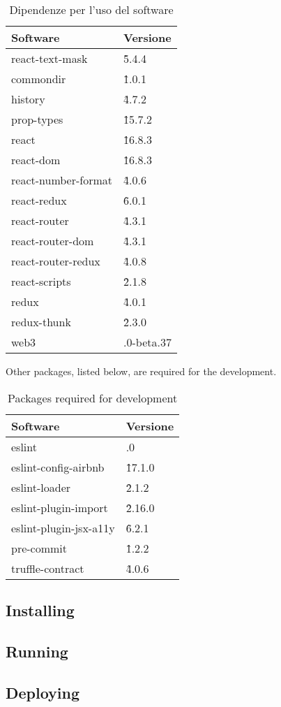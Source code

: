 \renewcommand{\arraystretch}{1.5}
\begin{longtable}{ 
		>{\centering}p{} 
		>{\centering}p{}
	}
	\caption{Dipendenze per l'uso del software}\\
	\rowcolorhead
	\textbf{\color{white}Software} & 
	\textbf{\color{white}Versione}
	\tabularnewline  
	\endhead	
	


	react-text-mask & \^5.4.4
	\tabularnewline
	commondir &\^1.0.1
	\tabularnewline
	history &\^4.7.2
	\tabularnewline
	prop-types &\^15.7.2\tabularnewline
	react &\^16.8.3\tabularnewline
	react-dom &\^16.8.3\tabularnewline
	react-number-format &\^4.0.6\tabularnewline
	react-redux &\^6.0.1\tabularnewline
	react-router &\^4.3.1\tabularnewline
	react-router-dom &\^4.3.1\tabularnewline
	react-router-redux &\^4.0.8\tabularnewline
	react-scripts &\^2.1.8\tabularnewline
	redux &\^4.0.1\tabularnewline
	redux-thunk &\^2.3.0\tabularnewline
	web3 & 1.0.0-beta.37\tabularnewline
	
\end{longtable}

Other packages, listed below, are required for the development.
\renewcommand{\arraystretch}{1.5}
\begin{longtable}{ 
		>{\centering}p{} 
		>{\centering}p{}
	}
	\caption{Packages required for development}\\
	\rowcolorhead
	\textbf{\color{white}Software} & 
	\textbf{\color{white}Versione}
	\tabularnewline  
	\endhead	
	
	eslint & 5.12.0\tabularnewline
	eslint-config-airbnb & \^17.1.0\tabularnewline
	eslint-loader & \^2.1.2\tabularnewline
	eslint-plugin-import & \^2.16.0\tabularnewline
	eslint-plugin-jsx-a11y & \^6.2.1\tabularnewline
	pre-commit & \^1.2.2\tabularnewline
	truffle-contract & \^4.0.6
	
\end{longtable}


\subsection{Installing}


\subsection{Running}
\subsection{Deploying}
